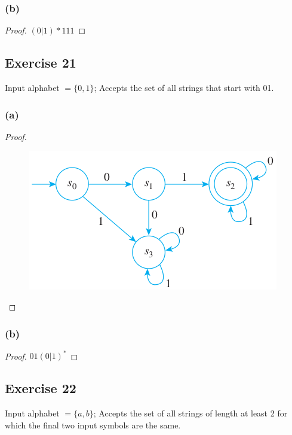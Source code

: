 \documentclass[14pt]{extarticle}
\begin{document}
\subsubsection{(b)}
\begin{proof}
    \((0|1)*111\)
\end{proof}

\subsection{Exercise 21}
Input alphabet \(= \{0, 1\}\); Accepts the set of all strings that start with 01.

\subsubsection{(a)}

\begin{proof}
    \begin{figure}[ht!]
        \centering
        \includegraphics[scale=0.5]{../images/12.2.21.a.png}
    \end{figure}
\end{proof}

\subsubsection{(b)}

\begin{proof}
    \(01(0 | 1)^*\)
\end{proof}

\subsection{Exercise 22}
Input alphabet \(= \{a, b\}\); Accepts the set of all strings of length at least 2 for which the final two input symbols are
the same.
\end{document}
